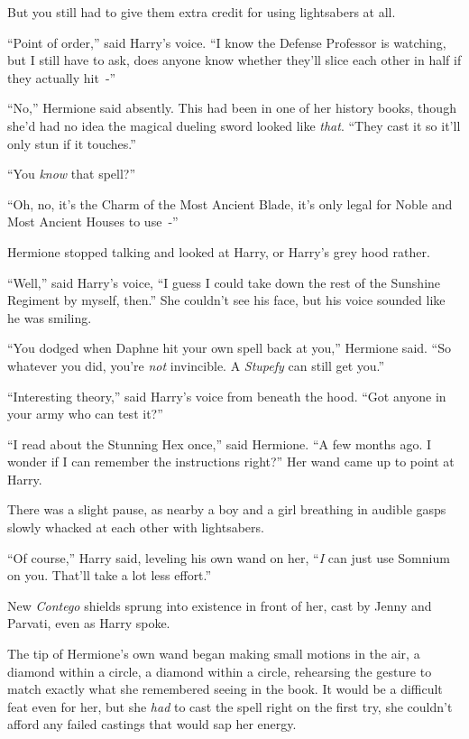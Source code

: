 But you still had to give them extra credit for using lightsabers at all.

``Point of order,'' said Harry's voice. ``I know the Defense Professor is watching, but I still have to ask, does anyone know whether they'll slice each other in half if they actually hit~-''

``No,'' Hermione said absently. This had been in one of her history books, though she'd had no idea the magical dueling sword looked like \emph{that}. ``They cast it so it'll only stun if it touches.''

``You \emph{know} that spell?''

``Oh, no, it's the Charm of the Most Ancient Blade, it's only legal for Noble and Most Ancient Houses to use~-''

Hermione stopped talking and looked at Harry, or Harry's grey hood rather.

``Well,'' said Harry's voice, ``I guess I could take down the rest of the Sunshine Regiment by myself, then.'' She couldn't see his face, but his voice sounded like he was smiling.

``You dodged when Daphne hit your own spell back at you,'' Hermione said. ``So whatever you did, you're \emph{not} invincible. A \emph{Stupefy} can still get you.''

``Interesting theory,'' said Harry's voice from beneath the hood. ``Got anyone in your army who can test it?''

``I read about the Stunning Hex once,'' said Hermione. ``A few months ago. I wonder if I can remember the instructions right?'' Her wand came up to point at Harry.

There was a slight pause, as nearby a boy and a girl breathing in audible gasps slowly whacked at each other with lightsabers.

``Of course,'' Harry said, leveling his own wand on her, ``\emph{I} can just use Somnium on you. That'll take a lot less effort.''

New \emph{Contego} shields sprung into existence in front of her, cast by Jenny and Parvati, even as Harry spoke.

The tip of Hermione's own wand began making small motions in the air, a diamond within a circle, a diamond within a circle, rehearsing the gesture to match exactly what she remembered seeing in the book. It would be a difficult feat even for her, but she \emph{had} to cast the spell right on the first try, she couldn't afford any failed castings that would sap her energy.

